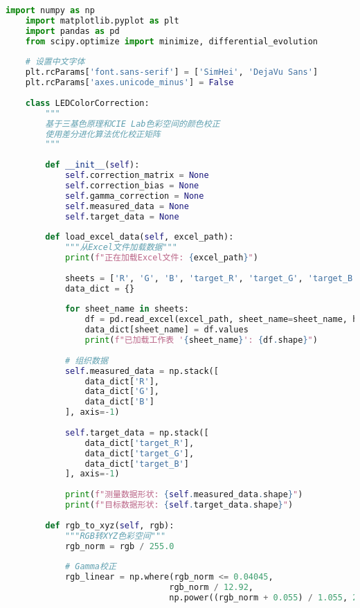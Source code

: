 \begin{lstlisting}[language=Python]
    import numpy as np
    import matplotlib.pyplot as plt
    import pandas as pd
    from scipy.optimize import minimize, differential_evolution
    
    # 设置中文字体
    plt.rcParams['font.sans-serif'] = ['SimHei', 'DejaVu Sans']
    plt.rcParams['axes.unicode_minus'] = False
    
    class LEDColorCorrection:
        """
        基于三基色原理和CIE Lab色彩空间的颜色校正
        使用差分进化算法优化校正矩阵
        """
        
        def __init__(self):
            self.correction_matrix = None
            self.correction_bias = None
            self.gamma_correction = None
            self.measured_data = None
            self.target_data = None
            
        def load_excel_data(self, excel_path):
            """从Excel文件加载数据"""
            print(f"正在加载Excel文件: {excel_path}")
            
            sheets = ['R', 'G', 'B', 'target_R', 'target_G', 'target_B']
            data_dict = {}
            
            for sheet_name in sheets:
                df = pd.read_excel(excel_path, sheet_name=sheet_name, header=None).iloc[0:64,0:64]
                data_dict[sheet_name] = df.values
                print(f"已加载工作表 '{sheet_name}': {df.shape}")
            
            # 组织数据
            self.measured_data = np.stack([
                data_dict['R'],
                data_dict['G'], 
                data_dict['B']
            ], axis=-1)
            
            self.target_data = np.stack([
                data_dict['target_R'],
                data_dict['target_G'],
                data_dict['target_B']
            ], axis=-1)
            
            print(f"测量数据形状: {self.measured_data.shape}")
            print(f"目标数据形状: {self.target_data.shape}")
        
        def rgb_to_xyz(self, rgb):
            """RGB转XYZ色彩空间"""
            rgb_norm = rgb / 255.0
            
            # Gamma校正
            rgb_linear = np.where(rgb_norm <= 0.04045,
                                 rgb_norm / 12.92,
                                 np.power((rgb_norm + 0.055) / 1.055, 2.4))
            

\end{lstlisting}
